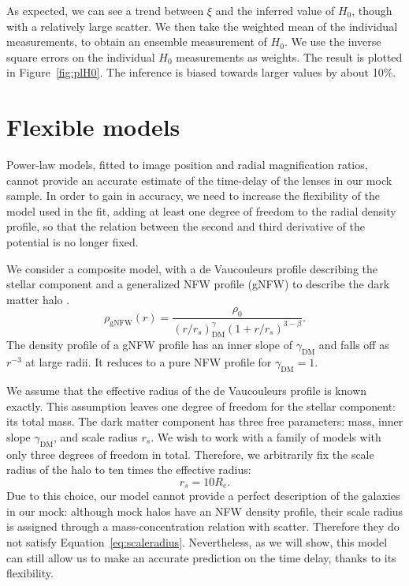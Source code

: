 \documentclass[usenatbib]{mnras}
\def\reff{R_e}
\def\gammadm{\gamma_{\mathrm{DM}}}
\def\Sref#1{Section~\ref{#1}\xspace}
\def\Fref#1{Figure~\ref{#1}\xspace}
\def\Eref#1{Equation~\ref{#1}\xspace}
\begin{document}
%
As expected, we can see a trend between $\xi$ and the inferred value of $H_0$, though with a relatively large scatter.
We then take the weighted mean of the individual measurements, to obtain an ensemble measurement of $H_0$. We use the inverse square errors on the individual $H_0$ measurements as weights.
The result is plotted in \Fref{fig:plH0}. The inference is biased towards larger values by about 10\%.

\section{Flexible models}\label{sect:gnfw}

Power-law models, fitted to image position and radial magnification ratios, cannot provide an accurate estimate of the time-delay of the lenses in our mock sample.
In order to gain in accuracy, we need to increase the flexibility of the model used in the fit, adding at least one degree of freedom to the radial density profile, so that the relation between the second and third derivative of the potential is no longer fixed.

We consider a composite model, with a de Vaucouleurs profile describing the stellar component and a generalized NFW profile (gNFW) to describe the dark matter halo \citep{Zha96}.
\begin{equation}
\rho_{\mathrm{gNFW}}(r) = \frac{\rho_0}{(r/r_s)^\gammadm (1 + r/r_s)^{3 - \beta}}.
\end{equation}
The density profile of a gNFW profile has an inner slope of $\gammadm$ and falls off as $r^{-3}$ at large radii. It reduces to a pure NFW profile for $\gammadm=1$.

We assume that the effective radius of the de Vaucouleurs profile is known exactly.
This assumption leaves one degree of freedom for the stellar component: its total mass.
The dark matter component has three free parameters: mass, inner slope $\gammadm$, and scale radius $r_s$.
We wish to work with a family of models with only three degrees of freedom in total.
Therefore, we arbitrarily fix the scale radius of the halo to ten times the effective radius:
\begin{equation}\label{eq:scaleradius}
r_s = 10 \reff.
\end{equation}
Due to this choice, our model cannot provide a perfect description of the galaxies in our mock: although mock halos have an NFW density profile, their scale radius is assigned through a mass-concentration relation with scatter. Therefore they do not satisfy \Eref{eq:scaleradius}.
Nevertheless, as we will show, this model can still allow us to make an accurate prediction on the time delay, thanks to its flexibility.
\end{document}
